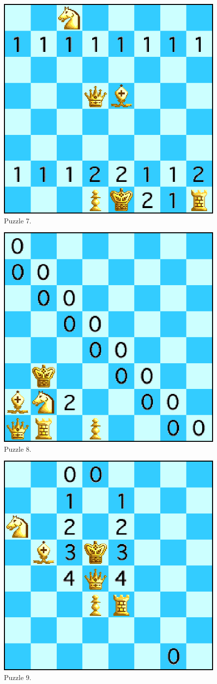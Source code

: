 \documentclass[runningheads]{llncs}
\begin{document}
\begin{figure}[H]
  \centering
  \includegraphics[width=0.6\linewidth]{figures/chess7.eps}
  \caption{Puzzle 7.}\label{fig:puzzle7}
\end{figure}

\begin{figure}[H]
  \centering
  \includegraphics[width=0.6\linewidth]{figures/chess8.eps}
  \caption{Puzzle 8.}\label{fig:puzzle8}
\end{figure}

\begin{figure}[H]
  \centering
  \includegraphics[width=0.6\linewidth]{figures/chess9.eps}
  \caption{Puzzle 9.}\label{fig:puzzle9}
\end{figure}
\end{document}
